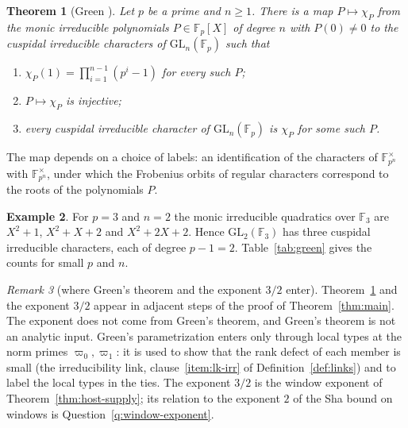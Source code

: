 \documentclass[11pt]{amsbook}
\theoremstyle{plain}
\newtheorem{theorem}{Theorem}[section]
\theoremstyle{definition}
\newtheorem{example}[theorem]{Example}
\theoremstyle{remark}
\newtheorem{remark}[theorem]{Remark}
\numberwithin{equation}{section}
\numberwithin{figure}{chapter}
\numberwithin{table}{chapter}
\newcommand{\F}{\mathbb{F}}
\begin{document}
\begin{theorem}[Green \cite{Green1955}]\label{thm:green}
Let $p$ be a prime and $n\ge1$. There is a map $P\mapsto\chi_P$ from
the monic irreducible polynomials $P\in\F_p[X]$ of degree $n$ with
$P(0)\ne0$ to the cuspidal irreducible characters of
$\mathrm{GL}_n(\F_p)$ such that
\begin{enumerate}[label=(\alph*)]
\item $\chi_P(1)=\prod_{i=1}^{n-1}(p^i-1)$ for every such $P$;
\item $P\mapsto\chi_P$ is injective;
\item every cuspidal irreducible character of $\mathrm{GL}_n(\F_p)$ is
$\chi_P$ for some such $P$.
\end{enumerate}
\end{theorem}

\noindent The map depends on a choice of labels: an identification of
the characters of $\F_{p^n}^\times$ with $\F_{p^n}^\times$, under which
the Frobenius orbits of regular characters correspond to the roots of
the polynomials $P$.

\begin{example}\label{ex:green}
For $p=3$ and $n=2$ the monic irreducible quadratics over $\F_3$ are
$X^2+1$, $X^2+X+2$ and $X^2+2X+2$. Hence $\mathrm{GL}_2(\F_3)$ has
three cuspidal irreducible characters, each of degree $p-1=2$.
Table~\ref{tab:green} gives the counts for small $p$ and $n$.
\end{example}

\begin{table}[htbp]
\centering

\caption{Cuspidal irreducible characters of $\mathrm{GL}_n(\F_p)$
correspond to monic irreducible polynomials $P$ of degree $n$ over
$\F_p$ with $P(0)\ne0$ (Theorem~\ref{thm:green}). The table gives
their number, by the M\"obius formula, and the degree
$\chi_P(1)=\prod_{i=1}^{n-1}(p^i-1)$.}
\label{tab:green}
\end{table}

\begin{remark}[where Green's theorem and the exponent $3/2$ enter]
\label{rem:green}
Theorem~\ref{thm:green} and the exponent $3/2$ appear in adjacent
steps of the proof of Theorem~\ref{thm:main}. The exponent does not
come from Green's theorem, and Green's theorem is not an analytic
input. Green's parametrization enters only through local types at the norm
primes $\varpi_0,\varpi_1$: it is used
to show that the rank defect of each member is small (the irreducibility
link, clause~\ref{item:lk-irr} of Definition~\ref{def:links}) and to label the
local
types in the ties. The exponent $3/2$ is the window exponent of
Theorem~\ref{thm:host-supply}; its relation to the exponent $2$ of
the Sha bound on windows is Question~\ref{q:window-exponent}.
\end{remark}
\end{document}
